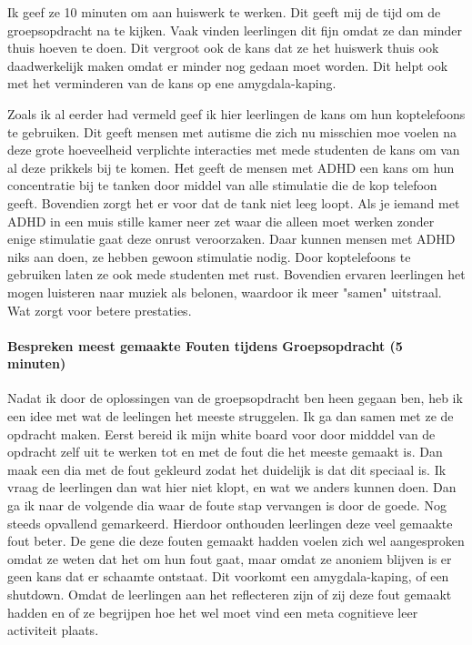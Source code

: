 \documentclass{article}
\begin{document}
                    Ik geef ze 10 minuten om aan huiswerk te werken. Dit geeft mij de tijd om de groepsopdracht na te kijken. Vaak vinden leerlingen dit fijn omdat ze dan minder thuis hoeven te doen. Dit vergroot ook de kans dat ze het huiswerk thuis ook daadwerkelijk maken omdat er minder nog gedaan moet worden.\cite{more-homework-equals-bad} Dit helpt ook met het verminderen van de kans op ene amygdala-kaping.\cite{more-homework-equals-bad} 

                    Zoals ik al eerder had vermeld geef ik hier leerlingen de kans om hun koptelefoons te gebruiken. Dit geeft mensen met autisme die zich nu misschien moe voelen na deze grote hoeveelheid verplichte interacties met mede studenten de kans om van al deze prikkels bij te komen. Het geeft de mensen met ADHD een kans om hun concentratie bij te tanken door middel van alle stimulatie die de kop telefoon geeft. Bovendien zorgt het er voor dat de tank niet leeg loopt. Als je iemand met ADHD in een muis stille kamer neer zet waar die alleen moet werken zonder enige stimulatie gaat deze onrust veroorzaken. Daar kunnen mensen met ADHD niks aan doen, ze hebben gewoon stimulatie nodig. Door koptelefoons te gebruiken laten ze ook mede studenten met rust. Bovendien ervaren leerlingen het mogen luisteren naar muziek als belonen, waardoor ik meer "samen" uitstraal. Wat zorgt voor betere prestaties.\cite{samen-boven-leads-to-better-results}
                
                \bigskip\noindent\paragraph{Bespreken meest gemaakte Fouten tijdens Groepsopdracht (5 minuten)}
                    
                    Nadat ik door de oplossingen van de groepsopdracht ben heen gegaan ben, heb ik een idee met wat de leelingen het meeste struggelen. Ik ga dan samen met ze de opdracht maken. Eerst bereid ik mijn white board voor door midddel van de opdracht zelf uit te werken tot en met de fout die het meeste gemaakt is. Dan maak een dia met de fout gekleurd zodat het duidelijk is dat dit speciaal is. Ik vraag de leerlingen dan wat hier niet klopt, en wat we anders kunnen doen. Dan ga ik naar de volgende dia waar de foute stap vervangen is door de goede. Nog steeds opvallend gemarkeerd. Hierdoor onthouden leerlingen deze veel gemaakte fout beter.\cite{Visual-Learners-are-the-most-common} De gene die deze fouten gemaakt hadden voelen zich wel aangesproken omdat ze weten dat het om hun fout gaat, maar omdat ze anoniem blijven is er geen kans dat er schaamte ontstaat. Dit voorkomt een amygdala-kaping, of een shutdown.\cite{more-homework-equals-bad}\cite{autisme-shutdowns} Omdat de leerlingen aan het reflecteren zijn of zij deze fout gemaakt hadden en of ze begrijpen hoe het wel moet vind een meta cognitieve leer activiteit plaats.\cite{NAME-ME}
                
\end{document}

